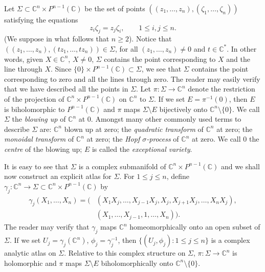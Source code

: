 Let $\Sigma\subset\mathbb C^n\times P^{n-1}(\mathbb C)$ be the set of points $((z_1,\ldots,z_n),(\zeta_1,\ldots,\zeta_n))$ satisfying the equations
\[
z_i\zeta_j=z_j\zeta_i,\qquad1\leq i,j\leq n.
\]
(We suppose in what follows that $n\geq2$). Notice that $((z_1,\ldots,z_n),(tz_1,\ldots,tz_n))\in\Sigma$, for all $(z_1,\ldots,z_n)\neq0$ and $t\in\mathbb C^*$. In other words, given $X\in\mathbb C^n$, $X\neq0$, $\Sigma$ contains the point corresponding to $X$ and the line through $X$. Since $\{0\}\times P^{n-1}(\mathbb C)\subset\Sigma$, we see that $\Sigma$ contains the point corresponding to zero and all the lines through zero. The reader may easily verify that we have described all the points in $\Sigma$. Let $\pi:\Sigma\longrightarrow\mathbb C^n$ denote the restriction of the projection of $\mathbb C^n\times P^{n-1}(\mathbb C)$ on $\mathbb C^n$ to $\Sigma$. If we set $E=\pi^{-1}(0)$, then $E$ is biholomorphic to $P^{n-1}(\mathbb C)$ and $\pi$
maps $\Sigma\setminus E$ bijectively onto $\mathbb C^n\setminus\{0\}$. We call $\Sigma$ the \emph{blowing up} of $\mathbb C^n$ at 0. Amongst many other commonly used terms to describe $\Sigma$ are: $\mathbb C^n$ blown up at zero; the \emph{quadratic transform} of $\mathbb C^n$ at zero; the \emph{monoidal transform} of $\mathbb C^n$ at zero; the \emph{Hopf $\sigma$-process} of $\mathbb C^n$ at zero. We call 0 the \emph{centre} of the blowing up; $E$ is called the \emph{exceptional variety}.

It is easy to see that $\Sigma$ is a complex submanifold of $\mathbb C^n\times P^{n-1}(\mathbb C)$ and we shall now construct an explicit atlas for $\Sigma$. For $1\leq j\leq n$, define $\gamma_j:\mathbb C^n\longrightarrow\Sigma\subset\mathbb C^n\times P^{n-1}(\mathbb C)$ by
\[
\begin{split}
\gamma_j(X_1,\ldots,X_n)=\big(& (X_1X_j,\ldots,X_{j-1}X_j,X_j,X_{j+1}X_j,\ldots,X_nX_j),\\
&(X_1,\ldots,X_{j-1},1,\ldots,X_n)\big).
\end{split}
\]
The reader may verify that $\gamma_j$ maps $\mathbb C^n$ homeomorphically onto an open subset of $\Sigma$. If we set $U_j=\gamma_j(\mathbb C^n)$, $\phi_j=\gamma_j^{-1}$, then $\{(U_j,\phi_j):1\leq j\leq n\}$ is a complex analytic atlas on $\Sigma$. Relative to this complex structure on $\Sigma$, $\pi:\Sigma\longrightarrow\mathbb C^n$ is holomorphic and $\pi$ maps $\Sigma\setminus E$ biholomorphically onto $\mathbb C^n\setminus\{0\}$.

